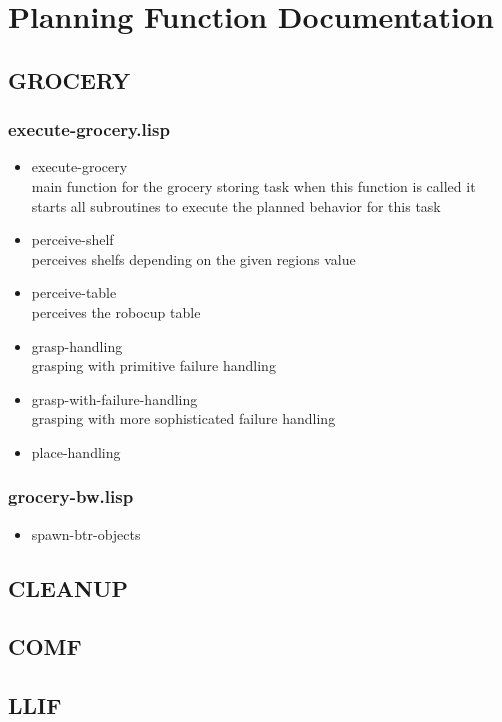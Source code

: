 \documentclass[main.tex]{subfiles}
\begin{document}
	\begingroup

	\renewcommand{\cleardoublepage}{}

	\renewcommand{\clearpage}{}

	\chapter{Planning Function Documentation}

		\chapterauthor{}
		
		\section{GROCERY}
		
		\subsection{execute-grocery.lisp}
		
		\begin{itemize}
			\item execute-grocery \\
			main function for the grocery storing task when this function is called it starts all subroutines to execute the planned behavior for this task
			\item perceive-shelf \\
			perceives shelfs depending on the given regions value
			\item perceive-table \\
			perceives the robocup table
			\item grasp-handling \\
			grasping with primitive failure handling
			\item grasp-with-failure-handling \\
			grasping with more sophisticated failure handling
			\item place-handling
		\end{itemize}
		
		\subsection{grocery-bw.lisp}
		
		\begin{itemize}
			\item spawn-btr-objects
		\end{itemize}
	  	
	  	\section{CLEANUP}
	  	
	  	
	  	\section{COMF}
	  	
	  	
	  	\section{LLIF}

	\endgroup
\end{document}
